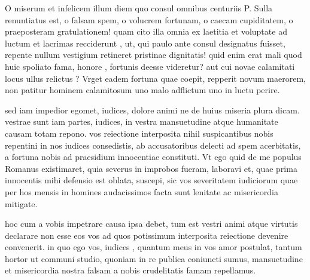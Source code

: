  O miserum et infelicem illum diem quo consul omnibus centuriis P. Sulla renuntiatus est, o falsam spem, o volucrem fortunam, o caecam cupiditatem, o praeposteram gratulationem! quam cito illa omnia ex laetitia et voluptate ad luctum et lacrimas recciderunt , ut, qui paulo ante consul designatus fuisset, repente nullum vestigium retineret pristinae dignitatis! quid enim erat mali quod huic spoliato fama, honore , fortunis deesse videretur? aut cui novae calamitati locus ullus relictus ? Vrget eadem fortuna quae coepit, repperit novum maerorem, non patitur hominem calamitosum uno malo adflictum uno in luctu perire.

 sed iam impedior egomet, iudices, dolore animi ne de huius miseria plura dicam. vestrae sunt iam partes, iudices, in vestra mansuetudine atque humanitate causam totam repono. vos reiectione interposita nihil suspicantibus nobis repentini in nos iudices consedistis, ab accusatoribus delecti ad spem acerbitatis, a fortuna nobis ad praesidium innocentiae constituti. Vt ego quid de me populus Romanus existimaret, quia severus in improbos fueram, laboravi et, quae prima innocentis mihi defensio est oblata, suscepi, sic vos severitatem iudiciorum quae per hos mensis in homines audacissimos facta sunt lenitate ac misericordia mitigate.

 hoc cum a vobis impetrare causa ipsa debet, tum est vestri animi atque virtutis declarare non esse eos vos ad quos potissimum interposita reiectione devenire convenerit. in quo ego vos, iudices , quantum meus in vos amor postulat, tantum hortor ut communi studio, quoniam in re publica coniuncti sumus, mansuetudine et misericordia nostra falsam a nobis crudelitatis famam repellamus.
